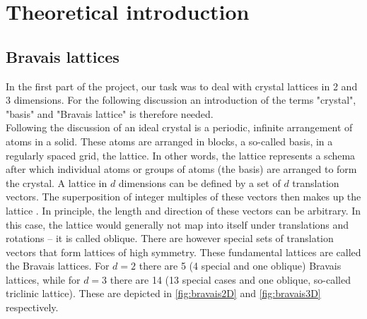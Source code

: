 \documentclass[11pt,a4paper]{article}
\begin{document}
\clearpage
\tableofcontents
\restoregeometry
\clearpage
\mbox{}

\setcounter{page}{1}
\pagestyle{plain}

\section{Theoretical introduction}
\label{sec:Theoretical introduction}

\subsection{Bravais lattices}
\label{ssec:Bravais lattices}
In the first part of the project, our task was to deal with crystal lattices in 2 and 3 dimensions. 
For the following discussion an introduction of the terms "crystal", "basis" and "Bravais lattice" is therefore needed. \\

Following the discussion of \cite{kittelChapter1Crystal2005} an ideal crystal is a periodic, infinite arrangement of atoms in a solid. 
These atoms are arranged in blocks, a so-called basis, in a regularly spaced grid, the lattice. 
In other words, the lattice represents a schema after which individual atoms or groups of atoms (the basis) are arranged to form the crystal. 
A lattice in $d$ dimensions can be defined by a set of $d$ translation vectors. 
The superposition of integer multiples of these vectors then makes up the lattice \cite{kittelChapter1Crystal2005}. 
In principle, the length and direction of these vectors can be arbitrary. 
In this case, the lattice would generally not map into itself under translations and rotations -- it is called oblique. 
There are however special sets of translation vectors that form lattices of high symmetry. 
These fundamental lattices are called the Bravais lattices. 
For $d=2$ there are 5 (4 special and one oblique) Bravais lattices, while for $d=3$ there are 14 (13 special cases and one oblique, so-called triclinic lattice). 
These are depicted in \autoref{fig:bravais2D} and \autoref{fig:bravais3D} respectively. 
\end{document}

